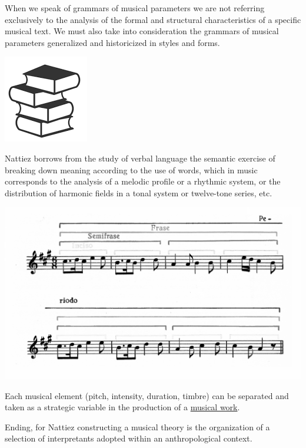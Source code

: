When we speak of grammars of musical parameters we are not referring exclusively to the analysis of the formal and structural characteristics of a specific musical text. We must also take into consideration the grammars of musical parameters generalized and historicized in styles and forms.

\begin{center}
\includegraphics[scale=0.45]{../img/trattato.png}
\end{center}

Nattiez borrows from the study of verbal language the semantic exercise of breaking down meaning according to the use of words, which in music corresponds to the analysis of a melodic profile or a rhythmic system, or the distribution of harmonic fields in a tonal system or twelve-tone series, etc.

\begin{center}
\includegraphics[scale=0.85]{../img/frasemus.png}
\end{center}

Each musical element (pitch, intensity, duration, timbre) can be separated and taken as a strategic variable in the production of a \href{http://www.musicaecodice.it/gitmedia/emc/1_media/quinta.mp4}{musical work}.

Ending, for Nattiez constructing a musical theory is the organization of a selection of interpretants adopted within an anthropological context.

